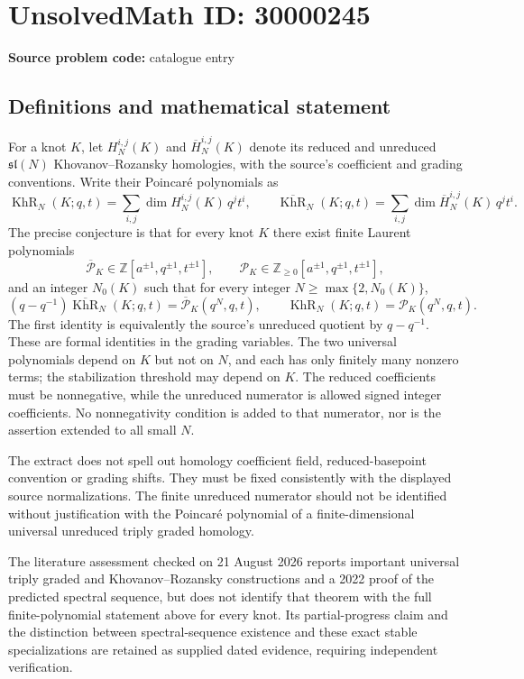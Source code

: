 \documentclass[11pt]{article}
\newcommand{\Z}{\mathbb{Z}}
\begin{document}
\section*{UnsolvedMath ID: 30000245}
\textbf{Source problem code:} catalogue entry
\subsection{Definitions and mathematical statement}
For a knot $K$, let $H_N^{i,j}(K)$ and $\overline H_N^{i,j}(K)$ denote its reduced and unreduced $\mathfrak{sl}(N)$ Khovanov--Rozansky homologies, with the source's coefficient and grading conventions. Write their Poincar\'e polynomials as
\[
 \operatorname{KhR}_N(K;q,t)=\sum_{i,j}\dim H_N^{i,j}(K)\,q^jt^i,
 \qquad
 \overline{\operatorname{KhR}}_N(K;q,t)=
                      \sum_{i,j}\dim\overline H_N^{i,j}(K)\,q^jt^i.
\]
The precise conjecture is that for every knot $K$ there exist finite Laurent polynomials
\[
 \overline{\mathcal P}_K\in\Z[a^{\pm1},q^{\pm1},t^{\pm1}],\qquad
 \mathcal P_K\in\Z_{\ge0}[a^{\pm1},q^{\pm1},t^{\pm1}],
\]
and an integer $N_0(K)$ such that for every integer $N\ge\max\{2,N_0(K)\}$,
\[
 (q-q^{-1})\overline{\operatorname{KhR}}_N(K;q,t)
       =\overline{\mathcal P}_K(q^N,q,t),\qquad
 \operatorname{KhR}_N(K;q,t)=\mathcal P_K(q^N,q,t).
\]
The first identity is equivalently the source's unreduced quotient by $q-q^{-1}$. These are formal identities in the grading variables. The two universal polynomials depend on $K$ but not on $N$, and each has only finitely many nonzero terms; the stabilization threshold may depend on $K$. The reduced coefficients must be nonnegative, while the unreduced numerator is allowed signed integer coefficients. No nonnegativity condition is added to that numerator, nor is the assertion extended to all small $N$.

The extract does not spell out homology coefficient field, reduced-basepoint convention or grading shifts. They must be fixed consistently with the displayed source normalizations. The finite unreduced numerator should not be identified without justification with the Poincar\'e polynomial of a finite-dimensional universal unreduced triply graded homology.

The literature assessment checked on 21 August 2026 reports important universal triply graded and Khovanov--Rozansky constructions and a 2022 proof of the predicted spectral sequence, but does not identify that theorem with the full finite-polynomial statement above for every knot. Its partial-progress claim and the distinction between spectral-sequence existence and these exact stable specializations are retained as supplied dated evidence, requiring independent verification.
\end{document}
